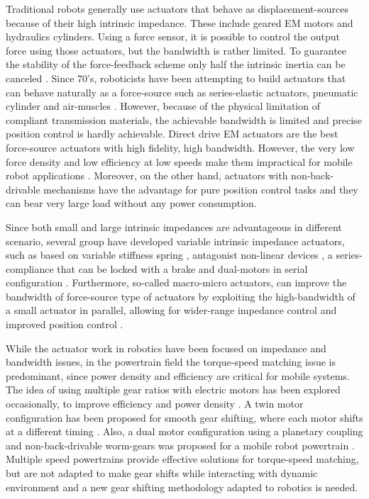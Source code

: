 Traditional robots generally use actuators that behave as displacement-sources because of their high intrinsic impedance. These include geared EM motors and hydraulics cylinders. Using a force sensor, it is possible to control the output force using those actuators, but the bandwidth is rather limited. To guarantee the stability of the force-feedback scheme only half the intrinsic inertia can be canceled \cite{hogan_impedance_2004}. Since 70's, roboticists have been attempting to build actuators that can behave naturally as a force-source such as series-elastic actuators, pneumatic cylinder and air-muscles \cite{hanafusa_stable_1977}\cite{pratt_series_1995}. However, because of the physical limitation of compliant transmission materials, the achievable bandwidth is limited and precise position control is hardly achievable. Direct drive EM actuators are the best force-source actuators with high fidelity, high bandwidth. However, the very low force density and low efficiency at low speeds make them impractical for mobile robot applications \cite{hollerbach_comparative_1992}. Moreover, on the other hand, actuators with non-back-drivable mechanisms have the advantage for pure position control tasks and they can bear very large load without any power consumption.

Since both small and large intrinsic impedances are advantageous in different scenario, several group have developed variable intrinsic impedance actuators, such as based on variable stiffness spring \cite{tonietti_design_2005}, antagonist non-linear devices \cite{koganezawa_antagonistic_2006}, a series-compliance that can be locked with a brake \cite{leach_linear_2012} and dual-motors in serial configuration \cite{kim_serial-type_2010}. Furthermore, so-called macro-micro actuators, can improve the bandwidth of force-source type of actuators by exploiting the high-bandwidth of a small actuator in parallel, allowing for wider-range impedance control and improved position control \cite{morrell_parallel-coupled_1998}.

While the actuator work in robotics have been focused on impedance and bandwidth issues, in the powertrain field the torque-speed matching issue is predominant, since power density and efficiency are critical for mobile systems. The idea of using multiple gear ratios with electric motors has been explored occasionally, to improve efficiency and power density \cite{mckeegan_antonovs_2011}. A twin motor configuration has been proposed for smooth gear shifting, where each motor shifts at a different timing \cite{bologna_electric_2014}. Also, a dual motor configuration using a planetary coupling and non-back-drivable worm-gears was proposed for a mobile robot powertrain \cite{lee_new_2012}. Multiple speed powertrains provide effective solutions for torque-speed matching, but are not adapted to make gear shifts while interacting with dynamic environment and a new gear shifting methodology adapted to robotics is needed.

